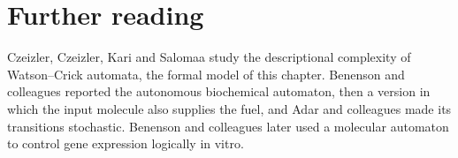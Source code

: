 \section*{Further reading}
Czeizler, Czeizler, Kari and Salomaa study the descriptional complexity of
Watson--Crick automata, the formal model of this chapter.\cite{Czeizler2009}
Benenson and colleagues reported the autonomous biochemical automaton,\cite{Benenson2001}
then a version in which the input molecule also supplies the
fuel,\cite{Benenson2003} and Adar and colleagues made its transitions
stochastic.\cite{Adar2004} Benenson and colleagues later used a molecular
automaton to control gene expression logically in vitro.\cite{Benenson2004}
